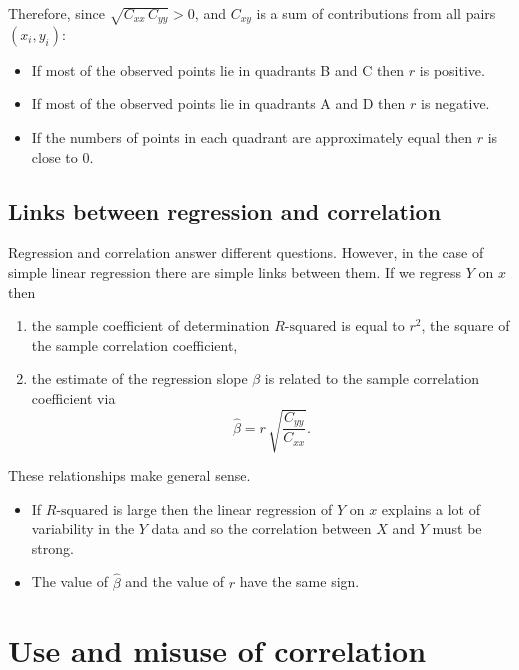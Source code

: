 \documentclass[
  british,
  11pt,
  openany, a4paper]{book}
\providecommand{\tightlist}{%
  \setlength{\itemsep}{0pt}\setlength{\parskip}{0pt}}
\begin{document}
Therefore, since \(\sqrt{C_{xx}\,C_{yy}}>0\), and \(C_{xy}\) is a sum of contributions from all pairs \((x_i,y_i)\):

\begin{itemize}
\tightlist
\item
  If most of the observed points lie in quadrants B and C then \(r\) is positive.
\item
  If most of the observed points lie in quadrants A and D then \(r\) is negative.
\item
  If the numbers of points in each quadrant are approximately equal then \(r\) is close to 0.
\end{itemize}

\subsection{Links between regression and correlation}\label{links-between-regression-and-correlation}

Regression and correlation answer different questions. However, in the case of simple linear regression there are simple links between them. If we regress \(Y\) on \(x\) then

\begin{enumerate}
\def\labelenumi{\arabic{enumi}.}
\tightlist
\item
  the sample coefficient of determination \(R\text{-squared}\) is equal to \(r^2\), the square of the sample correlation coefficient,
\item
  the estimate of the regression slope \(\beta\) is related to the sample correlation coefficient via
  \[ \hat{\beta} = r \,\sqrt{\frac{C_{yy}}{C_{xx}}}. \]
\end{enumerate}

These relationships make general sense.

\begin{itemize}
\tightlist
\item
  If \(R\text{-squared}\) is large then the linear regression of \(Y\) on \(x\) explains a lot of variability in the \(Y\) data and so the correlation between \(X\) and \(Y\) must be strong.
\item
  The value of \(\hat{\beta}\) and the value of \(r\) have the same sign.
\end{itemize}

\section{Use and misuse of correlation}\label{use-and-misuse-of-correlation}
\end{document}
